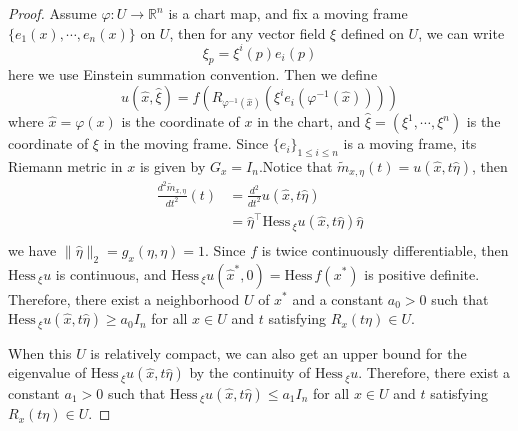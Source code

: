 \documentclass[12pt,a4paper,draft]{article}  %
\theoremstyle{definition}
\numberwithin{equation}{section}
\newcommand{\RR}{\mathbb{R}}
\newcommand{\hess}{\mathrm{Hess}\,}
\begin{document}
\begin{proof}
        Assume $\varphi:U\to\RR^n$ is a chart map, and fix a moving frame $\{e_1(x),\cdots,e_n(x)\}$ on $U$, then for any vector field $\xi$ defined on $U$, we can write
        \[
        \xi_p = \xi^i(p)e_i(p)
        \]
        here we use Einstein summation convention. Then we define
        \[
        u(\hat{x},\hat{\xi}) = f\left(R_{\varphi^{-1}(\hat{x})}\left(\xi^ie_i\left(\varphi^{-1}(\hat{x})\right)\right)\right)
        \]
        where $\hat{x} = \varphi(x)$ is the coordinate of $x$ in the chart, and $\hat{\xi} = (\xi^1,\cdots,\xi^n)$ is the coordinate of $\xi$ in the moving frame. Since $\{e_i\}_{1\leq i\leq n}$ is a moving frame, its Riemann metric in $x$ is given by $G_x = I_n$.Notice that $\widetilde{m}_{x,\eta}(t) = u(\hat{x}, t\hat{\eta})$, then
        \[
        \begin{aligned}
                \frac{d^2\widetilde{m}_{x,\eta}}{dt^2}(t) &= \frac{d^2}{dt^2}u(\hat{x}, t\hat{\eta})\\
                &= \hat{\eta}^\top \hess_\xi u(\hat{x}, t\hat{\eta}) \hat{\eta}\\
        \end{aligned}
        \]
        we have $\|\hat{\eta}\|_2 = g_x(\eta,\eta) = 1$. Since $f$ is twice continuously differentiable, then $\hess_\xi u$ is continuous, and $\hess_\xi u(\hat{x}^\ast, 0) = \hess f(x^\ast)$ is positive definite. Therefore, there exist a neighborhood $U$ of $x^\ast$ and a constant $a_0>0$ such that $\hess_\xi u(\hat{x}, t\hat{\eta}) \geq a_0 I_n$ for all $x\in U$ and $t$ satisfying $R_x(t\eta)\in U$. 

        When this $U$ is relatively compact, we can also get an upper bound for the eigenvalue of $\hess_\xi u(\hat{x}, t\hat{\eta})$ by the continuity of $\hess_\xi u$. Therefore, there exist a constant $a_1>0$ such that $\hess_\xi u(\hat{x}, t\hat{\eta}) \leq a_1 I_n$ for all $x\in U$ and $t$ satisfying $R_x(t\eta)\in U$.
\end{proof} 
\end{document}
